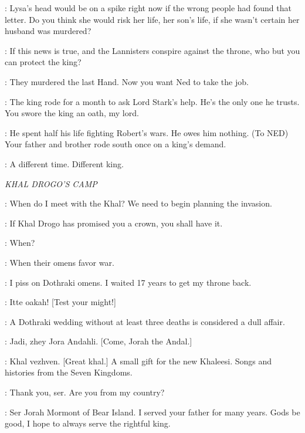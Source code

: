 \CATELYN: Lysa's head would be on a spike right now if the wrong people had found that letter. Do you think she would risk her life, her son's life, if she wasn't certain her husband was murdered? 

\LUWIN: If this news is true, and the Lannisters conspire against the throne, who but you can protect the king? 

\CATELYN: They murdered the last Hand. Now you want Ned to take the job. 

\LUWIN: The king rode for a month to ask Lord Stark's help. He's the only one he trusts. You swore the king an oath, my lord. 

\CATELYN: He spent half his life fighting Robert's wars. He owes him nothing. (To NED) Your father and brother rode south once on a king's demand. 

\LUWIN: A different time. Different king. 


\scene

\textit{KHAL DROGO'S CAMP} 


\VISERYS: When do I meet with the Khal? We need to begin planning the invasion. 

\ILLYRIO: If Khal Drogo has promised you a crown, you shall have it. 

\VISERYS: When? 

\ILLYRIO: When their omens favor war. 

\VISERYS: I piss on Dothraki omens. I waited 17 years to get my throne back. 

\DROGO: Itte oakah! [Test your might!]


\ILLYRIO: A Dothraki wedding without at least three deaths is considered a dull affair. 


\DROGO: Jadi, zhey Jora Andahli. [Come, Jorah the Andal.]

\JORAH: Khal vezhven. [Great khal.] A small gift for the new Khaleesi. Songs and histories from the Seven Kingdoms. 

\DAENERYS: Thank you, ser. Are you from my country? 

\JORAH: Ser Jorah Mormont of Bear Island. I served your father for many years. Gods be good, I hope to always serve the rightful king. 

